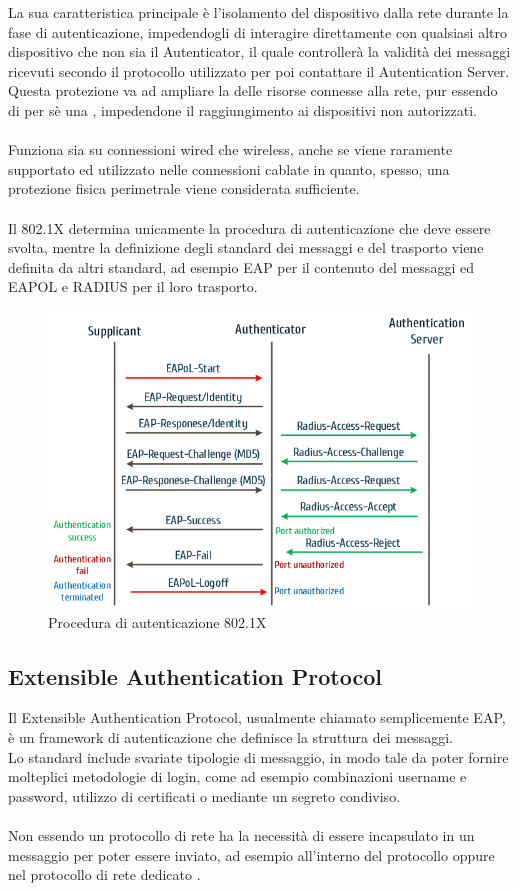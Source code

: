 \documentclass[Tesi.tex]{subfiles}
\begin{document}
La sua caratteristica principale è l'isolamento del dispositivo dalla rete durante la fase di autenticazione, impedendogli di interagire direttamente con qualsiasi altro dispositivo che non sia il Autenticator, il quale controllerà la validità dei messaggi ricevuti secondo il protocollo utilizzato per poi contattare il Autentication Server. \\
Questa protezione va ad ampliare la  delle risorse connesse alla rete, pur essendo di per sè una , impedendone il raggiungimento ai dispositivi non autorizzati. \\\\
Funziona sia su connessioni wired che wireless, anche se viene raramente supportato ed utilizzato nelle connessioni cablate in quanto, spesso, una protezione fisica perimetrale viene considerata sufficiente. \\\\
Il 802.1X determina unicamente la procedura di autenticazione che deve essere svolta, mentre la definizione degli standard dei messaggi e del trasporto viene definita da altri standard, ad esempio EAP per il contenuto del messaggi ed EAPOL e RADIUS per il loro trasporto.

\begin{figure}[H]
	\centering
	\includegraphics[width=0.78\linewidth]{"images/8021x-Authentication-message-flow"}
	\caption{Procedura di autenticazione 802.1X}
	\label{fig:Procedura di autenticazione 802.1X}
\end{figure}


\subsection{Extensible Authentication Protocol}
Il Extensible Authentication Protocol, usualmente chiamato semplicemente EAP, è un framework di autenticazione che definisce la struttura dei messaggi. \\
Lo standard include svariate tipologie di messaggio, in modo tale da poter fornire molteplici metodologie di login, come ad esempio combinazioni username e password, utilizzo di certificati o mediante un segreto condiviso. \\\\
Non essendo un protocollo di rete ha la necessità di essere incapsulato in un messaggio per poter essere inviato, ad esempio all'interno del protocollo  oppure nel protocollo di rete dedicato .
\end{document}
